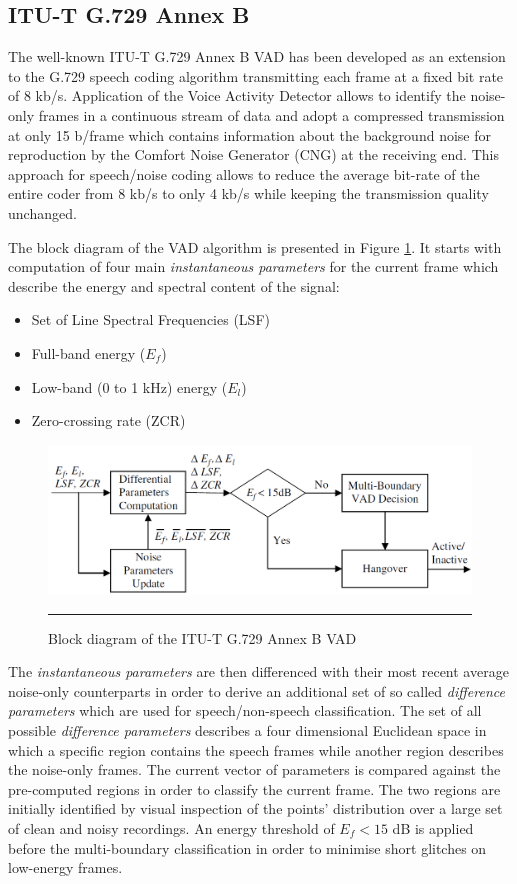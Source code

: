 \subsection{ITU-T G.729 Annex B}

The well-known ITU-T G.729 Annex B VAD has been developed as an extension to the G.729 speech coding algorithm \citep{G729Original} transmitting each frame at a fixed bit rate of 8 kb/s. Application of the Voice Activity Detector allows to identify the noise-only frames in a continuous stream of data and adopt a compressed transmission at only 15 b/frame which contains information about the background noise for reproduction by the Comfort Noise Generator (CNG) at the receiving end. This approach for speech/noise coding allows to reduce the average bit-rate of the entire coder from 8 kb/s to only 4 kb/s while keeping the transmission quality unchanged.

The block diagram of the VAD algorithm is presented in Figure \ref{fig:G729AnnexB}. It starts with computation of four main \emph{instantaneous parameters} for the current frame which describe the energy and spectral content of the signal:
\begin{itemize}
\item Set of Line Spectral Frequencies (LSF)
\item Full-band energy ($E_f$)
\item Low-band (0 to 1 kHz) energy ($E_l$)
\item Zero-crossing rate (ZCR)
\end{itemize}

\begin{figure}[htbp]
	\centering
		\includegraphics[width=0.9\columnwidth]{Figures/Chapter2/G729AnnexB.png}
		\rule{37em}{0.5pt}
	\caption[Block diagram of the ITU-T G.729 Annex B VAD]{Block diagram of the ITU-T G.729 Annex B VAD \cite{Kondoz}}
	\label{fig:G729AnnexB}
\end{figure}

The \emph{instantaneous parameters} are then differenced with their most recent average noise-only counterparts in order to derive an additional set of so called \emph{difference parameters} which are used for speech/non-speech classification. The set of all possible \emph{difference parameters} describes a four dimensional Euclidean space in which a specific region contains the speech frames while another region describes the noise-only frames. The current vector of parameters is compared against the pre-computed regions in order to classify the current frame. The two regions are initially identified by visual inspection of the points' distribution over a large set of clean and noisy recordings. An energy threshold of $E_f < 15$ dB is applied before the multi-boundary classification in order to minimise short glitches on low-energy frames.

